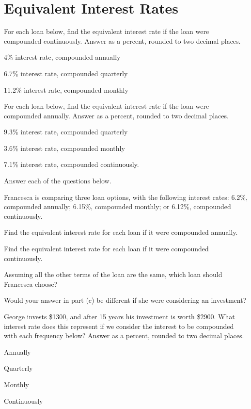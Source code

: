 \section*{Equivalent Interest Rates}
For each loan below, find the equivalent interest rate if the loan were compounded continuously. Answer as a percent, rounded to two decimal places.
\begin{senum}
\item 4\% interest rate, compounded annually
\item 6.7\% interest rate, compounded quarterly
\item 11.2\% interest rate, compounded monthly
\end{senum}
For each loan below, find the equivalent interest rate if the loan were compounded annually. Answer as a percent, rounded to two decimal places.
\begin{senum}
\item 9.3\% interest rate, compounded quarterly
\item 3.6\% interest rate, compounded monthly
\item 7.1\% interest rate, compounded continuously.
\end{senum}
\clearpage
\noindent Answer each of the questions below.
\begin{senum}
\item Francesca is comparing three loan options, with the following interest rates: 6.2\%, compounded annually; 6.15\%, compounded monthly; or 6.12\%, compounded continuously.
\begin{clist}
\item Find the equivalent interest rate for each loan if it were compounded annually.
\item Find the equivalent interest rate for each loan if it were compounded continuously.
\item Assuming all the other terms of the loan are the same, which loan should Francesca choose?
\item Would your answer in part (c) be different if she were considering an investment?
\end{clist}
\item George invests \$1300, and after 15 years his investment is worth \$2900. What interest rate does this represent if we consider the interest to be compounded with each frequency below? Answer as a percent, rounded to two decimal places.
\begin{clist}
\item Annually
\item Quarterly
\item Monthly
\item Continuously
\end{clist}
\end{senum}

